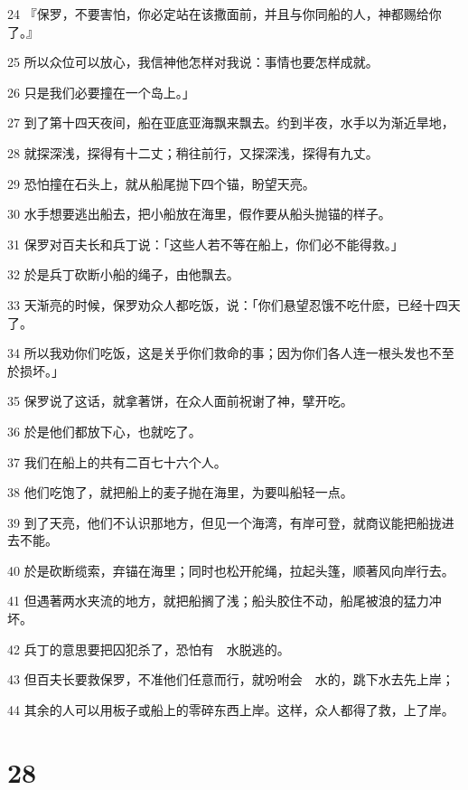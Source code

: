 \par 24 『保罗，不要害怕，你必定站在该撒面前，并且与你同船的人，神都赐给你了。』
\par 25 所以众位可以放心，我信神他怎样对我说：事情也要怎样成就。
\par 26 只是我们必要撞在一个岛上。」
\par 27 到了第十四天夜间，船在亚底亚海飘来飘去。约到半夜，水手以为渐近旱地，
\par 28 就探深浅，探得有十二丈；稍往前行，又探深浅，探得有九丈。
\par 29 恐怕撞在石头上，就从船尾抛下四个锚，盼望天亮。
\par 30 水手想要逃出船去，把小船放在海里，假作要从船头抛锚的样子。
\par 31 保罗对百夫长和兵丁说：「这些人若不等在船上，你们必不能得救。」
\par 32 於是兵丁砍断小船的绳子，由他飘去。
\par 33 天渐亮的时候，保罗劝众人都吃饭，说：「你们悬望忍饿不吃什麽，已经十四天了。
\par 34 所以我劝你们吃饭，这是关乎你们救命的事；因为你们各人连一根头发也不至於损坏。」
\par 35 保罗说了这话，就拿著饼，在众人面前祝谢了神，擘开吃。
\par 36 於是他们都放下心，也就吃了。
\par 37 我们在船上的共有二百七十六个人。
\par 38 他们吃饱了，就把船上的麦子抛在海里，为要叫船轻一点。
\par 39 到了天亮，他们不认识那地方，但见一个海湾，有岸可登，就商议能把船拢进去不能。
\par 40 於是砍断缆索，弃锚在海里；同时也松开舵绳，拉起头篷，顺著风向岸行去。
\par 41 但遇著两水夹流的地方，就把船搁了浅；船头胶住不动，船尾被浪的猛力冲坏。
\par 42 兵丁的意思要把囚犯杀了，恐怕有　水脱逃的。
\par 43 但百夫长要救保罗，不准他们任意而行，就吩咐会　水的，跳下水去先上岸；
\par 44 其余的人可以用板子或船上的零碎东西上岸。这样，众人都得了救，上了岸。

\chapter{28}

